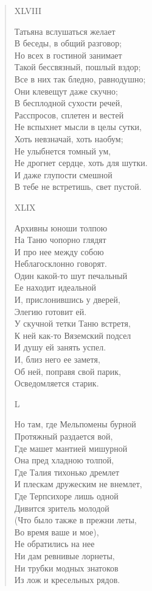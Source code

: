 \begin{verse}
XLVIII

Татьяна вслушаться желает\\
В беседы, в общий разговор;\\
Но всех в гостиной занимает\\
Такой бессвязный, пошлый вздор;\\
Все в них так бледно, равнодушно;\\
Они клевещут даже скучно;\\
В бесплодной сухости речей,\\
Расспросов, сплетен и вестей\\
Не вспыхнет мысли в целы сутки,\\
Хоть невзначай, хоть наобум;\\
Не улыбнется томный ум,\\
Не дрогнет сердце, хоть для шутки.\\
И даже глупости смешной\\
В тебе не встретишь, свет пустой.

XLIX

Архивны юноши толпою\\
На Таню чопорно глядят\\
И про нее между собою\\
Неблагосклонно говорят.\\
Один какой-то шут печальный\\
Ее находит идеальной\\
И, прислонившись у дверей,\\
Элегию готовит ей.\\
У скучной тетки Таню встретя,\\
К ней как-то Вяземский подсел\\
И душу ей занять успел.\\
И, близ него ее заметя,\\
Об ней, поправя свой парик,\\
Осведомляется старик.

L

Но там, где Мельпомены бурной\\
Протяжный раздается вой,\\
Где машет мантией мишурной\\
Она пред хладною толпой,\\
Где Талия тихонько дремлет\\
И плескам дружеским не внемлет,\\
Где Терпсихоре лишь одной\\
Дивится зритель молодой\\
(Что было также в прежни леты,\\
Во время ваше и мое),\\
Не обратились на нее\\
Ни дам ревнивые лорнеты,\\
Ни трубки модных знатоков\\
Из лож и кресельных рядов.


\end{verse}
